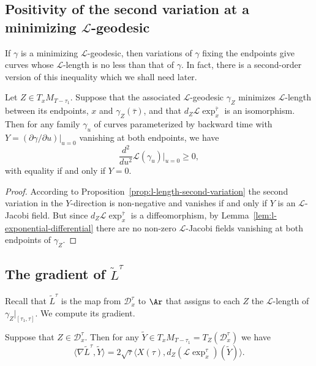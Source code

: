 \subsection{Positivity of the second variation at a minimizing
${\mathcal L}$-geodesic}


If $\gamma$ is a minimizing ${\mathcal L}$-geodesic, then variations
of $\gamma$ fixing the endpoints  give curves whose ${\mathcal
L}$-length is no less than that of $\gamma$. In fact, there is a
second-order version of this inequality which we shall need later.

\begin{corollary}\label{cor:l-length-second-variation-positive}
\label{posform}
Let $Z\in T_xM_{T-\tau_1}$. Suppose that the associated ${\mathcal
L}$-geodesic $\gamma_Z$ minimizes ${\mathcal L}$-length between its
endpoints, $x$ and $\gamma_Z(\bar\tau)$, and that $d_Z{\mathcal
L}\exp^{\bar\tau}_x$ is an isomorphism. Then for any family
$\gamma_u$ of curves parameterized by backward time with
$Y=(\partial \gamma/\partial u)|_{u=0}$ vanishing at both endpoints,
we have
$$\frac{d^2}{du^2}{\mathcal L}(\gamma_u)|_{u=0}\ge 0,$$
with equality if and only if $Y=0$.
\end{corollary}

\begin{proof}
According to Proposition~\ref{prop:l-length-second-variation} the second variation  in the
$Y$-direction is non-negative and vanishes if and only if $Y$ is an ${\mathcal
L}$-Jacobi field. But since $d_Z{\mathcal L}\exp_x^{\bar\tau}$ is a
diffeomorphism, by Lemma~\ref{lem:l-exponential-differential} there are no non-zero ${\mathcal
L}$-Jacobi fields vanishing at both endpoints of $\gamma_Z$.
\end{proof}



\subsection{The gradient of $\widetilde L^\tau$}

Recall that $\widetilde
L^{\tau}$ is the map from ${\mathcal D}^{\tau}_x$ to $\Ar$ that
assigns to each $Z$ the ${\mathcal L}$-length of
$\gamma_Z|_{[\tau_1,\tau]}$. We compute its gradient.




\begin{lemma}\label{lem:l-length-tilde-gradient}
\label{DtildeL}
Suppose that $Z\in {\mathcal D}^{\tau}_x$. Then for any $\widetilde
Y\in T_xM_{T-\tau_1}=T_Z({\mathcal D}^{\tau}_x)$ we have
$$ \langle \nabla\widetilde L^{\tau},\widetilde Y\rangle =2\sqrt{\tau}\langle
X(\tau),d_Z\left({\mathcal L}\exp_x^{\tau}\right)(\widetilde
Y)\rangle.$$
\end{lemma}


